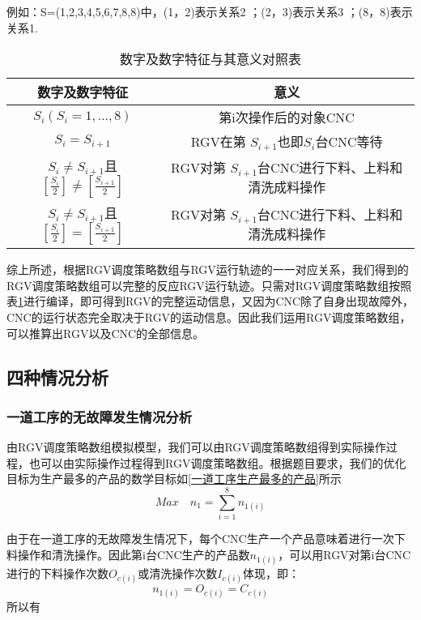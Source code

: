 \documentclass[withoutpreface,bwprint]{cumcmthesis} %
\begin{document}
例如：S=(1,2,3,4,5,6,7,8,8)中，(1，2)表示关系2 ；(2，3)表示关系3 ；(8，8)表示关系1.


\begin{table}[!htbp]
\caption{数字及数字特征与其意义对照表}\label{数字及数字特征与其意义对照表} \centering
\begin{tabular}{cc}
\toprule[1.5pt]
数字及数字特征 & 意义 \\
\midrule[1pt]
 $S_i(S_i=1,...,8)$	    & 第i次操作后的对象CNC  \\ 
 $S_i=S_{i+1}$	    & RGV在第 $S_{i+1}$也即$S_i$台CNC等待  \\ 
 $S_i\neq S_{i+1}$且$[\frac{S_i}{2}]\neq[\frac{S_{i+1}}{2}]$	    & RGV对第 $S_{i+1}$台CNC进行下料、上料和清洗成料操作  \\ 
 $S_i\neq S_{i+1}$且$[\frac{S_i}{2}]=[\frac{S_{i+1}}{2}]$	    & RGV对第 $S_{i+1}$台CNC进行下料、上料和清洗成料操作  \\ 
\bottomrule[1.5pt]
\end{tabular}
\end{table}

综上所述，根据RGV调度策略数组与RGV运行轨迹的一一对应关系，我们得到的RGV调度策略数组可以完整的反应RGV运行轨迹。只需对RGV调度策略数组按照表\ref{数字及数字特征与其意义对照表}进行编译，即可得到RGV的完整运动信息，又因为CNC除了自身出现故障外，CNC的运行状态完全取决于RGV的运动信息。因此我们运用RGV调度策略数组，可以推算出RGV以及CNC的全部信息。

\subsection{四种情况分析}
\subsubsection{一道工序的无故障发生情况分析}


由RGV调度策略数组模拟模型，我们可以由RGV调度策略数组得到实际操作过程，也可以由实际操作过程得到RGV调度策略数组。根据题目要求，我们的优化目标为生产最多的产品的数学目标如\eqref{一道工序生产最多的产品}所示
\begin{equation}
Max\quad n_{1}=\sum_{i=1}^8 n_{1(i)}
\label{一道工序生产最多的产品}
\end{equation}

由于在一道工序的无故障发生情况下，每个CNC生产一个产品意味着进行一次下料操作和清洗操作。因此第i台CNC生产的产品数$n_{1(i)}$，可以用RGV对第i台CNC进行的下料操作次数$O_{c(i)}$或清洗操作次数$I_{c(i)}$体现，即：
\begin{equation}
n_{1(i)}=O_{c(i)}=C_{c(i)}
\end{equation}
所以有
\end{document}
